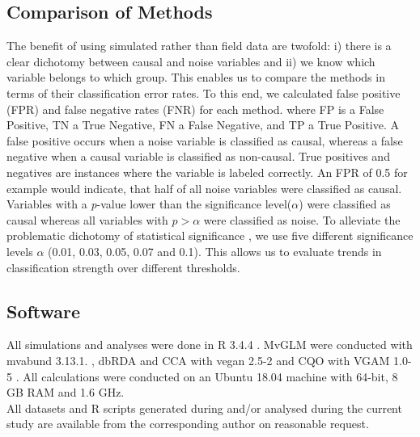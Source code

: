 \documentclass[a4paper,11pt]{article}
\begin{document}
	\subsection*{Comparison of Methods}
        The benefit of using simulated rather than field data are twofold:
        i) there is a clear dichotomy between causal and noise variables and 
        ii) we know which variable belongs to which group. 
        This enables us to compare the methods in terms of their classification error rates.
        To this end, we calculated false positive (FPR) and false negative rates (FNR) for each method.
        where FP is a False Positive, TN a True Negative, FN a False Negative, and TP a True Positive. 
        A false positive occurs when a noise variable is classified as causal, whereas a false negative when a causal variable is classified as non-causal. 
        True positives and negatives are instances where the variable is labeled correctly. 
        An FPR of 0.5 for example would indicate, that half of all noise variables were classified as causal. 
        Variables with a \textit{p}-value lower than the significance level($\alpha$) were classified as causal whereas all variables with $p > \alpha $  were classified as noise.
        To alleviate the problematic dichotomy of statistical significance \citep{Greenland2016}, we use five different significance levels $\alpha$ (0.01, 0.03, 0.05, 0.07 and 0.1).
		This allows us to evaluate trends in classification strength over different thresholds. 
        

	\subsection*{Software}
		All simulations and analyses were done in R 3.4.4 \citep{RCT2018}.
		MvGLM were conducted with mvabund 3.13.1. \citep{Wang2019}, dbRDA and CCA with vegan 2.5-2 \citep{Oksanen2018} and CQO with VGAM 1.0-5 \citep{VGAM19}. 
		All calculations were conducted on an Ubuntu 18.04 machine with 64-bit, 8 GB RAM and 1.6 GHz.\\
		All datasets and R scripts generated during and/or analysed during the current study are available from the corresponding author on reasonable request.
\end{document}
